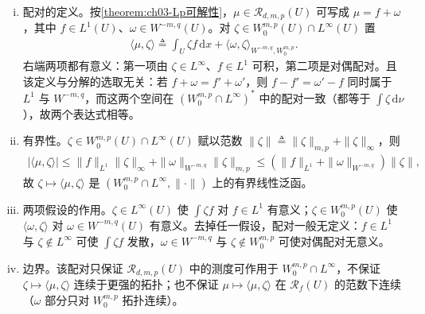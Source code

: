\documentclass[../../main.tex]{subfiles}%
\begin{document}
\begin{remark}\label{remark:ch03-对偶意义补注}
\begin{enumerate}[(i)]
\item 配对的定义。按\cref{theorem:ch03-Lp可解性}，$\mu\in\mathscr{R}_{d,m,p}(U)$ 可写成 $\mu=f+\omega$，其中 $f\in L^1(U)$、$\omega\in W^{-m,q}(U)$。对 $\zeta\in W^{m,p}_0(U)\cap L^\infty(U)$ 置
\begin{align*}
\langle\mu,\zeta\rangle\triangleq\int_U\zeta f\,\mathrm{d}x+\langle\omega,\zeta\rangle_{W^{-m,q},W^{m,p}_0}.
\end{align*}
右端两项都有意义：第一项由 $\zeta\in L^\infty$、$f\in L^1$ 可积，第二项是对偶配对。且该定义与分解的选取无关：若 $f+\omega=f'+\omega'$，则 $f-f'=\omega'-f$ 同时属于 $L^1$ 与 $W^{-m,q}$，而这两个空间在 $(W^{m,p}_0\cap L^\infty)^*$ 中的配对一致（都等于 $\int\zeta\,\mathrm{d}\nu$），故两个表达式相等。
\item 有界性。$\zeta\in W^{m,p}_0(U)\cap L^\infty(U)$ 赋以范数 $\|\zeta\|\triangleq\|\zeta\|_{m,p}+\|\zeta\|_\infty$，则
\begin{align*}
|\langle\mu,\zeta\rangle|\leqslant\|f\|_{L^1}\|\zeta\|_\infty+\|\omega\|_{W^{-m,q}}\|\zeta\|_{m,p}
\leqslant(\|f\|_{L^1}+\|\omega\|_{W^{-m,q}})\|\zeta\|,
\end{align*}
故 $\zeta\mapsto\langle\mu,\zeta\rangle$ 是 $(W^{m,p}_0\cap L^\infty,\|\cdot\|)$ 上的有界线性泛函。
\item 两项假设的作用。$\zeta\in L^\infty(U)$ 使 $\int\zeta f$ 对 $f\in L^1$ 有意义；$\zeta\in W^{m,p}_0(U)$ 使 $\langle\omega,\zeta\rangle$ 对 $\omega\in W^{-m,q}(U)$ 有意义。去掉任一假设，配对一般无定义：$f\in L^1$ 与 $\zeta\notin L^\infty$ 可使 $\int\zeta f$ 发散，$\omega\in W^{-m,q}$ 与 $\zeta\notin W^{m,p}_0$ 可使对偶配对无意义。
\item 边界。该配对只保证 $\mathscr{R}_{d,m,p}(U)$ 中的测度可作用于 $W^{m,p}_0\cap L^\infty$，不保证 $\zeta\mapsto\langle\mu,\zeta\rangle$ 连续于更强的拓扑；也不保证 $\mu\mapsto\langle\mu,\zeta\rangle$ 在 $\mathscr{R}_f(U)$ 的范数下连续（$\omega$ 部分只对 $W^{m,p}_0$ 拓扑连续）。
\end{enumerate}
\end{remark}
\end{document}
